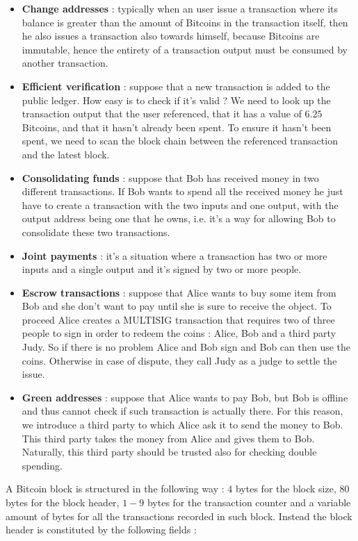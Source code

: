 \begin{itemize}
\item \textbf{Change addresses} : typically when an user issue a transaction where its balance is greater than the amount of Bitcoins in the transaction itself, then he also issues a transaction also towards himself, because Bitcoins are immutable, hence the entirety of a transaction output must be consumed by another transaction.
\item \textbf{Efficient verification} : suppose that a new transaction is added to the public ledger. How easy is to check if it's valid ? We need to look up the transaction output that the user referenced, that it has a value of $6.25$ Bitcoins, and that it hasn't already been spent. To ensure it hasn't been spent, we need to scan the block chain between the referenced transaction and the latest block.
\item \textbf{Consolidating funds} : suppose that Bob has received money in two different transactions. If Bob wants to spend all the received money he just have to create a transaction with the two inputs and one output, with the output address being one that he owns, i.e. it's a way for allowing Bob to consolidate these two transactions.
\item \textbf{Joint payments} : it's a situation where a transaction has two or more inputs and a single output and it's signed by two or more people.
\item \textbf{Escrow transactions} : suppose that Alice wants to buy some item from Bob and she don't want to pay until she is sure to receive the object. To proceed Alice creates a MULTISIG transaction that requires two of three people to sign in order to redeem the coins : Alice, Bob and a third party Judy. So if there is no problem Alice and Bob sign and Bob can then use the coins. Otherwise in case of dispute, they call Judy as a judge to settle the issue.
\item \textbf{Green addresses} : suppose that Alice wants to pay Bob, but Bob is offline and thus cannot check if such transaction is actually there. For this reason, we introduce a third party to which Alice ask it to send the money to Bob. This third party takes the money from Alice and gives them to Bob. Naturally, this third party should be trusted also for checking double spending.
\end{itemize}
A Bitcoin block is structured in the following way : $4$ bytes for the block size, $80$ bytes for the block header, $1-9$ bytes for the transaction counter and a variable amount of bytes for all the transactions recorded in such block. Instead the block header is constituted by the following fields :
